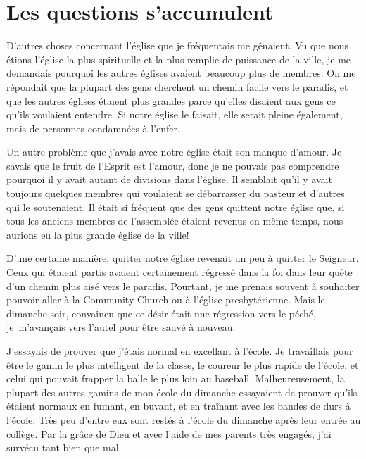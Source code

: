 \section{Les questions s'accumulent}

D'autres choses concernant l'église que je fréquentais me gênaient.
 Vu que nous étions l'église la plus spirituelle et la plus remplie
 de puissance de la ville,
 je me demandais pourquoi les autres églises avaient beaucoup plus
 de membres. On me répondait que la plupart des
 gens cherchent un chemin facile vers le paradis, et que les autres églises
 étaient plus grandes parce qu'elles disaient aux gens ce qu'ils voulaient
 entendre. Si notre église le faisait, elle serait pleine également,
 mais de personnes condamnées à l'enfer.

Un autre problème que j'avais avec notre église était son manque d'amour. Je
 savais que le fruit de l'Esprit est l'amour,
 donc je ne pouvais pas comprendre
 pourquoi il y avait autant de divisions dans l'église. Il semblait
 qu'il y avait toujours quelques membres qui voulaient se débarrasser du pasteur et
 d'autres qui le soutenaient. Il était si fréquent que des gens quittent notre église que,
 si tous les anciens membres de l'assemblée étaient revenus en même temps, nous aurions
 eu la plus grande église de la ville!

D'une certaine manière, quitter notre église revenait un peu à quitter le
 Seigneur. Ceux qui étaient partis avaient certainement régressé dans la foi dans leur quête
 d'un chemin plus aisé vers le paradis. Pourtant, je me prenais souvent à
 souhaiter pouvoir aller à la \Og Community Church \Fg{} ou à l'église presbytérienne. Mais
 le dimanche soir, convaincu que ce désir était une régression vers le péché, je~m'avançais vers l'autel pour être \Og sauvé \Fg{} à nouveau.
 
J'essayais de prouver que j'étais normal en excellant à l'école. Je travaillais
 pour être le gamin le plus intelligent de la classe, le coureur le plus rapide de
 l'école, et celui qui pouvait frapper la balle le plus loin au baseball.
 Malheureusement, la plupart des autres gamins de mon école du dimanche
 essayaient de prouver qu'ils étaient normaux en fumant, en buvant, et en
 traînant avec les bandes de durs à l'école. Très peu d'entre eux sont restés à
 l'école du dimanche après leur entrée au collège. Par la grâce de Dieu et avec
 l'aide de mes parents très engagés, j'ai survécu tant bien que mal.

